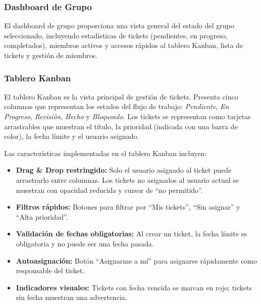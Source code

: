 \documentclass[12pt,a4paper]{article}
\begin{document}
\subsubsection{Dashboard de Grupo}

El dashboard de grupo proporciona una vista general del estado del grupo seleccionado, incluyendo estadísticas de tickets (pendientes, en progreso, completados), miembros activos y accesos rápidos al tablero Kanban, lista de tickets y gestión de miembros.

\subsubsection{Tablero Kanban}

El tablero Kanban es la vista principal de gestión de tickets. Presenta cinco columnas que representan los estados del flujo de trabajo: \textit{Pendiente}, \textit{En Progreso}, \textit{Revisión}, \textit{Hecho} y \textit{Bloqueado}. Los tickets se representan como tarjetas arrastrables que muestran el título, la prioridad (indicada con una barra de color), la fecha límite y el usuario asignado.


Las características implementadas en el tablero Kanban incluyen:

\begin{itemize}[noitemsep]
    \item \textbf{Drag \& Drop restringido:} Solo el usuario asignado al ticket puede arrastrarlo entre columnas. Los tickets no asignados al usuario actual se muestran con opacidad reducida y cursor de ``no permitido''.
    \item \textbf{Filtros rápidos:} Botones para filtrar por ``Mis tickets'', ``Sin asignar'' y ``Alta prioridad''.
    \item \textbf{Validación de fechas obligatorias:} Al crear un ticket, la fecha límite es obligatoria y no puede ser una fecha pasada.
    \item \textbf{Autoasignación:} Botón ``Asignarme a mí'' para asignarse rápidamente como responsable del ticket.
    \item \textbf{Indicadores visuales:} Tickets con fecha vencida se marcan en rojo; tickets sin fecha muestran una advertencia.
\end{itemize}
\end{document}

